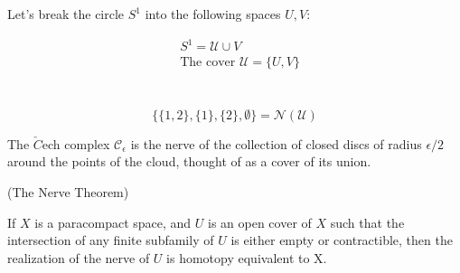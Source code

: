 \documentclass[11pt,a4paper]{report}
\begin{document}
              \begin{Ex} Let's break the circle $S^1$ into the following spaces $U, V$: \\
              \begin{center}
            \end{center}
               \begin{align*}
                &S^1 = \mathcal{U} \cup V\\
                &\textrm{The cover } \mathcal{U} = \{U, V\}\\
              \end{align*}
              \\
                \begin{center}
 

                \end{center}
              
              \[
              \{\{1, 2\}, \{1\},\{2\}, \emptyset\} = \mathcal{N}(\mathcal{U})
              \]
              \end{Ex}

              
              The $\check{C}$ech complex $\mathcal{C}_\epsilon$ is the nerve of the collection of closed discs of radius $\epsilon/2$ around the points of the cloud, thought of as a cover of its union.
              \begin{thm}(The Nerve Theorem)
              
            If $X$ is a paracompact space, and $U$ is an open cover of $X$ such that the
            intersection of any finite subfamily of $U$ is either empty or contractible,
            then the realization of the nerve of $U$ is homotopy equivalent to X.\cite{hatcher}
            
              \end{thm}
\end{document}
